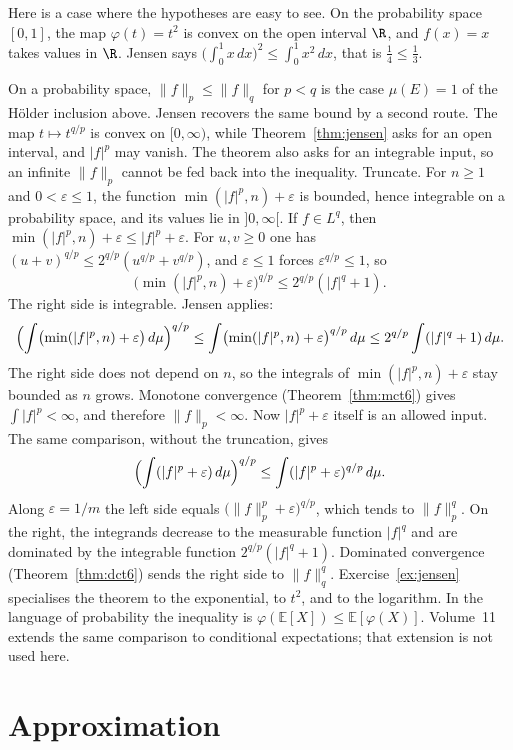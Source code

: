 Here is a case where the hypotheses are easy to see. On the probability space $[0,1]$, the map $\varphi(t)=t^2$ is convex on the open interval $\R$, and $f(x)=x$ takes values in $\R$. Jensen says $\bigl(\int_0^1 x\,dx\bigr)^2\le\int_0^1 x^2\,dx$, that is $\frac14\le\frac13$.

On a probability space, $\|f\|_p\le\|f\|_q$ for $p<q$ is the case $\mu(E)=1$ of the Hölder inclusion above. Jensen recovers the same bound by a second route. The map $t\mapsto t^{q/p}$ is convex on $[0,\infty)$, while Theorem~\ref{thm:jensen} asks for an open interval, and $|f|^p$ may vanish. The theorem also asks for an integrable input, so an infinite $\|f\|_p$ cannot be fed back into the inequality. Truncate. For $n\ge1$ and $0<\varepsilon\le1$, the function $\min(|f|^p,n)+\varepsilon$ is bounded, hence integrable on a probability space, and its values lie in $]0,\infty[$. If $f\in L^q$, then $\min(|f|^p,n)+\varepsilon\le|f|^p+\varepsilon$. For $u,v\ge0$ one has $(u+v)^{q/p}\le2^{q/p}(u^{q/p}+v^{q/p})$, and $\varepsilon\le1$ forces $\varepsilon^{q/p}\le1$, so
\[
\bigl(\min(|f|^p,n)+\varepsilon\bigr)^{q/p}\le2^{q/p}(|f|^q+1).
\]
The right side is integrable. Jensen applies:
\[
\Bigl(\int\bigl(\min(|f|^p,n)+\varepsilon\bigr)\,d\mu\Bigr)^{q/p}\le\int\bigl(\min(|f|^p,n)+\varepsilon\bigr)^{q/p}\,d\mu\le2^{q/p}\int(|f|^q+1)\,d\mu.
\]
The right side does not depend on $n$, so the integrals of $\min(|f|^p,n)+\varepsilon$ stay bounded as $n$ grows. Monotone convergence (Theorem~\ref{thm:mct6}) gives $\int|f|^p<\infty$, and therefore $\|f\|_p<\infty$. Now $|f|^p+\varepsilon$ itself is an allowed input. The same comparison, without the truncation, gives
\[
\Bigl(\int(|f|^p+\varepsilon)\,d\mu\Bigr)^{q/p}\le\int(|f|^p+\varepsilon)^{q/p}\,d\mu.
\]
Along $\varepsilon=1/m$ the left side equals $\bigl(\|f\|_p^p+\varepsilon\bigr)^{q/p}$, which tends to $\|f\|_p^q$. On the right, the integrands decrease to the measurable function $|f|^q$ and are dominated by the integrable function $2^{q/p}(|f|^q+1)$. Dominated convergence (Theorem~\ref{thm:dct6}) sends the right side to $\|f\|_q^q$. Exercise~\ref{ex:jensen} specialises the theorem to the exponential, to $t^2$, and to the logarithm. In the language of probability the inequality is $\varphi(\mathbb E[X])\le\mathbb E[\varphi(X)]$. Volume~11 extends the same comparison to conditional expectations; that extension is not used here.

\section{Approximation}

